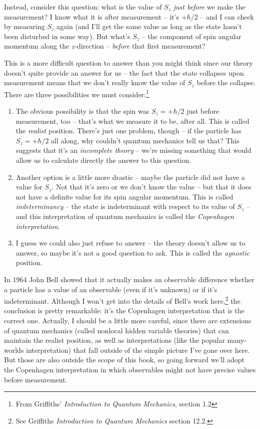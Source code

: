 Instead, consider this question:  what is the value of $S_z$ \emph{just before} we make the measurement?  I know what it is after measurement -- it's $+\hbar/2$ -- and I can check by measuring $S_z$ again (and I'll get the same value as long as the state hasn't been disturbed in some way).  But what's $S_z$ -- the component of spin angular momentum along the $z$-direction -- \emph{before} that first measurement?

This is a more difficult question to answer than you might think since our theory doesn't quite provide an answer for us -- the fact that the state collapses upon measurement means that we don't really know the value of $S_z$ before the collapse.  There are three possibilities we must consider:\footnote{From Griffiths' \emph{Introduction to Quantum Mechanics}, section 1.2}
\begin{enumerate}
\item The obvious possibility is that the spin was $S_z  = +\hbar/2$ just before measurement, too -- that's what we measure it to be, after all. This is called the \emph{realist} position.  There's just one problem, though -- if the particle has $S_z = +\hbar/2$ all along, why couldn't quantum mechanics tell us that?  This suggests that it's an \emph{incomplete theory} -- we're missing something that would allow us to calculate directly the answer to this question.
\item Another option is a little more drastic -- maybe the particle did not have a value for $S_z$.  Not that it's zero or we don't know the value -- but that it does not have a definite value for its spin angular momentum.  This is called \emph{indeterminancy} -- the state is indeterminant with respect to its value of $S_z$ -- and this interpretation of quantum mechanics is called the \emph{Copenhagen interpretation}.  
\item I guess we could also just refuse to answer -- the theory doesn't allow us to answer, so maybe it's not a good question to ask.  This is called the \emph{agnostic} position.
\end{enumerate}

In 1964 John Bell showed that it actually makes an observable difference whether a particle has a value of an observable (even if it's unknown) or if it's indeterminant.  Although I won't get into the details of Bell's work here,\footnote{See Griffiths \emph{Introduction to Quantum Mechanics} section 12.2.} the conclusion is pretty remarkable: it's the Copenhagen interpretation that is the correct one.  Actually, I should be a little more careful, since there are extensions of quantum mechanics (called nonlocal hidden variable theories) that can maintain the realist position, as well as interpretations (like the popular many-worlds interpretation) that fall outside of the simple picture I've gone over here.  But those are also outside the scope of this book, so going forward we'll adopt the Copenhagen interpretation in which observables might not have precise values before measurement.


